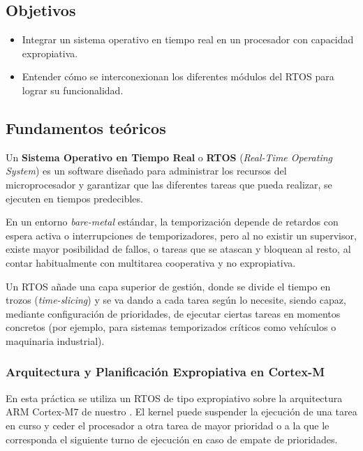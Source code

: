 \documentclass[../main.tex]{subfiles}
\begin{document}

    \subsection{Objetivos}
        \begin{itemize}
            \item Integrar un sistema operativo en tiempo real en un procesador con capacidad expropiativa.
            \item Entender cómo se interconexionan los diferentes módulos del RTOS para lograr su funcionalidad.
        \end{itemize}

    \subsection{Fundamentos teóricos}

        Un \textbf{Sistema Operativo en Tiempo Real} o \textbf{RTOS} (\textit{Real-Time Operating System}) es un software diseñado para administrar los recursos del microprocesador y garantizar que las diferentes tareas que pueda realizar, se ejecuten en tiempos predecibles. 

        En un entorno \textit{bare-metal} estándar, la temporización depende de retardos con espera activa o interrupciones de temporizadores, pero al no existir un supervisor, existe mayor posibilidad de fallos, o tareas que se atascan y bloquean al resto, al contar habitualmente con multitarea cooperativa y no expropiativa.

        Un RTOS añade una capa superior de gestión, donde se divide el tiempo en trozos (\textit{time-slicing}) y se va dando a cada tarea según lo necesite, siendo capaz, mediante configuración de prioridades, de ejecutar ciertas tareas en momentos concretos (por ejemplo, para sistemas temporizados críticos como vehículos o maquinaria industrial).

        \subsubsection{Arquitectura y Planificación Expropiativa en Cortex-M}

            En esta práctica se utiliza un RTOS de tipo expropiativo sobre la arquitectura ARM Cortex-M7 de nuestro \MCU. El kernel puede suspender la ejecución de una tarea en curso y ceder el procesador a otra tarea de mayor prioridad o a la que le corresponda el siguiente turno de ejecución en caso de empate de prioridades.
\end{document}
